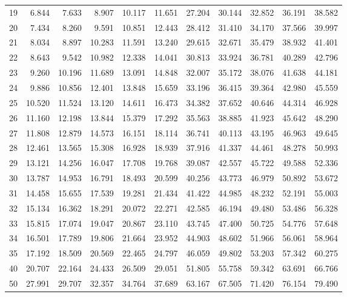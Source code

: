 \begin{tabular}{|r|*{10}{r}|}
19 &  6.844 &  7.633 &  8.907 & 10.117 & 11.651 & 27.204 & 30.144 & 32.852 & 36.191 & 38.582 \\ 
20 &  7.434 &  8.260 &  9.591 & 10.851 & 12.443 & 28.412 & 31.410 & 34.170 & 37.566 & 39.997 \\ 
21 &  8.034 &  8.897 & 10.283 & 11.591 & 13.240 & 29.615 & 32.671 & 35.479 & 38.932 & 41.401 \\ 
22 &  8.643 &  9.542 & 10.982 & 12.338 & 14.041 & 30.813 & 33.924 & 36.781 & 40.289 & 42.796 \\ 
23 &  9.260 & 10.196 & 11.689 & 13.091 & 14.848 & 32.007 & 35.172 & 38.076 & 41.638 & 44.181 \\ 
24 &  9.886 & 10.856 & 12.401 & 13.848 & 15.659 & 33.196 & 36.415 & 39.364 & 42.980 & 45.559 \\ 
25 & 10.520 & 11.524 & 13.120 & 14.611 & 16.473 & 34.382 & 37.652 & 40.646 & 44.314 & 46.928 \\ 
26 & 11.160 & 12.198 & 13.844 & 15.379 & 17.292 & 35.563 & 38.885 & 41.923 & 45.642 & 48.290 \\ 
27 & 11.808 & 12.879 & 14.573 & 16.151 & 18.114 & 36.741 & 40.113 & 43.195 & 46.963 & 49.645 \\ 
28 & 12.461 & 13.565 & 15.308 & 16.928 & 18.939 & 37.916 & 41.337 & 44.461 & 48.278 & 50.993 \\ 
29 & 13.121 & 14.256 & 16.047 & 17.708 & 19.768 & 39.087 & 42.557 & 45.722 & 49.588 & 52.336 \\ 
30 & 13.787 & 14.953 & 16.791 & 18.493 & 20.599 & 40.256 & 43.773 & 46.979 & 50.892 & 53.672 \\ 
31 & 14.458 & 15.655 & 17.539 & 19.281 & 21.434 & 41.422 & 44.985 & 48.232 & 52.191 & 55.003 \\ 
32 & 15.134 & 16.362 & 18.291 & 20.072 & 22.271 & 42.585 & 46.194 & 49.480 & 53.486 & 56.328 \\ 
33 & 15.815 & 17.074 & 19.047 & 20.867 & 23.110 & 43.745 & 47.400 & 50.725 & 54.776 & 57.648 \\ 
34 & 16.501 & 17.789 & 19.806 & 21.664 & 23.952 & 44.903 & 48.602 & 51.966 & 56.061 & 58.964 \\ 
35 & 17.192 & 18.509 & 20.569 & 22.465 & 24.797 & 46.059 & 49.802 & 53.203 & 57.342 & 60.275 \\ 
40 & 20.707 & 22.164 & 24.433 & 26.509 & 29.051 & 51.805 & 55.758 & 59.342 & 63.691 & 66.766 \\ 
50 & 27.991 & 29.707 & 32.357 & 34.764 & 37.689 & 63.167 & 67.505 & 71.420 & 76.154 & 79.490 \\ 

\end{tabular}
